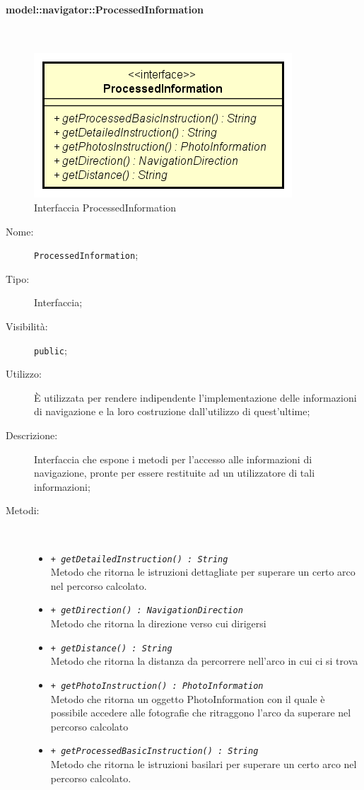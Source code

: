 \documentclass[../DefinizioneDiProdotto.tex]{subfiles}
\begin{document}
\paragraph{model::navigator::ProcessedInformation}
\
\begin{figure}[H]
	\centering
	\includegraphics[width=\maxwidth]{img/ProcessedInformation.png}
	\caption{Interfaccia ProcessedInformation}\label{fig:model::navigator::ProcessedInformation} 
\end{figure}
\begin{description}
	\item[Nome:] \texttt{ProcessedInformation};
	\item[Tipo:] Interfaccia;
	\item[Visibilità:] \texttt{public};
	\item[Utilizzo:] È utilizzata per rendere indipendente l'implementazione delle informazioni di navigazione e la loro costruzione dall'utilizzo di quest'ultime;
	\item[Descrizione:] Interfaccia che espone i metodi per l'accesso alle informazioni di navigazione, pronte per essere restituite ad un utilizzatore di tali informazioni;
	\item[Metodi:] \
	\begin{itemize}
		\item \texttt{+ \textit{getDetailedInstruction() : String}}\\
		Metodo che ritorna le istruzioni dettagliate per superare un certo arco nel percorso calcolato.
		\item \texttt{+ \textit{getDirection() : NavigationDirection}}\\
		Metodo che ritorna la direzione verso cui dirigersi
		\item \texttt{+ \textit{getDistance() : String}}\\
		Metodo che ritorna la distanza da percorrere nell'arco in cui ci si trova
		\item \texttt{+ \textit{getPhotoInstruction() : PhotoInformation}}\\
		Metodo che ritorna un oggetto PhotoInformation con il quale è possibile accedere alle fotografie che ritraggono l'arco da superare nel percorso calcolato
		\item \texttt{+ \textit{getProcessedBasicInstruction() : String}}\\
		Metodo che ritorna le istruzioni basilari per superare un certo arco nel percorso calcolato.
	\end{itemize}
\end{description}
\end{document}
